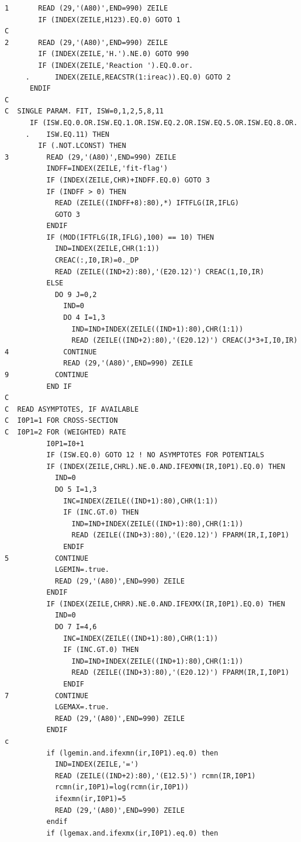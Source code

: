 \documentclass[12pt,dvips]{article}
\begin{document}
\begin{small}
\begin{verbatim}
1       READ (29,'(A80)',END=990) ZEILE
        IF (INDEX(ZEILE,H123).EQ.0) GOTO 1
C
2       READ (29,'(A80)',END=990) ZEILE
        IF (INDEX(ZEILE,'H.').NE.0) GOTO 990
        IF (INDEX(ZEILE,'Reaction ').EQ.0.or.
     .      INDEX(ZEILE,REACSTR(1:ireac)).EQ.0) GOTO 2
      ENDIF
C
C  SINGLE PARAM. FIT, ISW=0,1,2,5,8,11
      IF (ISW.EQ.0.OR.ISW.EQ.1.OR.ISW.EQ.2.OR.ISW.EQ.5.OR.ISW.EQ.8.OR.
     .    ISW.EQ.11) THEN
        IF (.NOT.LCONST) THEN
3         READ (29,'(A80)',END=990) ZEILE
          INDFF=INDEX(ZEILE,'fit-flag')
          IF (INDEX(ZEILE,CHR)+INDFF.EQ.0) GOTO 3
          IF (INDFF > 0) THEN
            READ (ZEILE((INDFF+8):80),*) IFTFLG(IR,IFLG)
            GOTO 3
          ENDIF
          IF (MOD(IFTFLG(IR,IFLG),100) == 10) THEN
            IND=INDEX(ZEILE,CHR(1:1))
            CREAC(:,I0,IR)=0._DP
            READ (ZEILE((IND+2):80),'(E20.12)') CREAC(1,I0,IR)
          ELSE
            DO 9 J=0,2
              IND=0
              DO 4 I=1,3
                IND=IND+INDEX(ZEILE((IND+1):80),CHR(1:1))
                READ (ZEILE((IND+2):80),'(E20.12)') CREAC(J*3+I,I0,IR)
4             CONTINUE
              READ (29,'(A80)',END=990) ZEILE
9           CONTINUE
          END IF
C
C  READ ASYMPTOTES, IF AVAILABLE
C  I0P1=1 FOR CROSS-SECTION
C  I0P1=2 FOR (WEIGHTED) RATE
          I0P1=I0+1
          IF (ISW.EQ.0) GOTO 12 ! NO ASYMPTOTES FOR POTENTIALS
          IF (INDEX(ZEILE,CHRL).NE.0.AND.IFEXMN(IR,I0P1).EQ.0) THEN
            IND=0
            DO 5 I=1,3
              INC=INDEX(ZEILE((IND+1):80),CHR(1:1))
              IF (INC.GT.0) THEN
                IND=IND+INDEX(ZEILE((IND+1):80),CHR(1:1))
                READ (ZEILE((IND+3):80),'(E20.12)') FPARM(IR,I,I0P1)
              ENDIF
5           CONTINUE
            LGEMIN=.true.
            READ (29,'(A80)',END=990) ZEILE
          ENDIF
          IF (INDEX(ZEILE,CHRR).NE.0.AND.IFEXMX(IR,I0P1).EQ.0) THEN
            IND=0
            DO 7 I=4,6
              INC=INDEX(ZEILE((IND+1):80),CHR(1:1))
              IF (INC.GT.0) THEN
                IND=IND+INDEX(ZEILE((IND+1):80),CHR(1:1))
                READ (ZEILE((IND+3):80),'(E20.12)') FPARM(IR,I,I0P1)
              ENDIF
7           CONTINUE
            LGEMAX=.true.
            READ (29,'(A80)',END=990) ZEILE
          ENDIF
c
          if (lgemin.and.ifexmn(ir,I0P1).eq.0) then
            IND=INDEX(ZEILE,'=')
            READ (ZEILE((IND+2):80),'(E12.5)') rcmn(IR,I0P1)
            rcmn(ir,I0P1)=log(rcmn(ir,I0P1))
            ifexmn(ir,I0P1)=5
            READ (29,'(A80)',END=990) ZEILE
          endif
          if (lgemax.and.ifexmx(ir,I0P1).eq.0) then

\end{verbatim}
\end{small}
\end{document}
